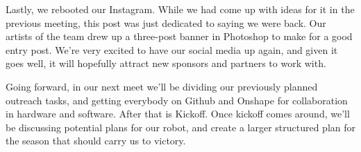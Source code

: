 Lastly, we rebooted our Instagram. While we had come up with ideas for it in the previous meeting, this post was just dedicated to saying we were back. Our artists of the team drew up a three-post banner in Photoshop to make for a good entry post. We're very excited to have our social media up again, and given it goes well, it will hopefully attract new sponsors and partners to work with.

Going forward, in our next meet we'll be dividing our previously planned outreach tasks, and getting everybody on Github and Onshape for collaboration in hardware and software. After that is Kickoff. Once kickoff comes around, we'll be discussing potential plans for our robot, and create a larger structured plan for the season that should carry us to victory.




